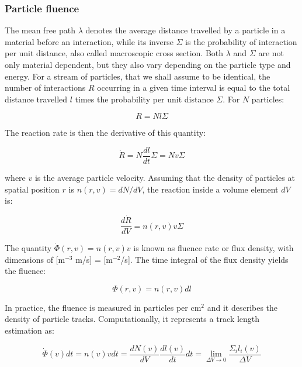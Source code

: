 \documentclass[encoding=utf8,british]{tumphthesis}
\begin{document}
\subsubsection{Particle fluence}

The mean free path $\lambda$ denotes the average distance travelled by a particle in a material before an interaction, while its inverse $\Sigma$ is the probability of interaction per unit distance, also called macroscopic cross section. Both $\lambda$ and $\Sigma$ are not only material dependent, but they also vary depending on the particle type and energy. For a stream of particles, that we shall assume to be identical, the number of interactions $R$ occurring in a given time interval is equal to the total distance travelled $l$ times the probability per unit distance $\Sigma$. For $N$ particles:

\begin{equation}
    R = N l \Sigma
\end{equation}

The reaction rate is then the derivative of this quantity:

\begin{equation}
    \dot{R} = N \frac{dl}{dt}\Sigma = N v \Sigma
\end{equation}

where $v$ is the average particle velocity. Assuming that the density of particles at spatial position $r$ is $n(r,v) = dN/dV$, the reaction inside a volume element $dV$ is:

\begin{equation}
    \frac{d\dot{R}}{dV} = n(r,v) v \Sigma
\end{equation}

The quantity $\dot{\Phi} (r,v) = n(r,v) v$ is known as fluence rate or flux density, with dimensions of [m$^{-3}$ m/s] = [m$^{-2}$/s]. The time integral of the flux density yields the fluence:

\begin{equation}
    \Phi(r,v) = n(r,v) dl
\end{equation}

In practice, the fluence is measured in particles per cm$^2$ and it describes the density of particle tracks. Computationally, it represents a track length estimation as:

\begin{equation}
    \dot{\Phi}(v) dt = n(v) v dt = \frac{dN(v)}{dV}\frac{dl(v)}{dt}dt = \lim_{\Delta V \to 0} \frac{\Sigma_i l_i(v)}{\Delta V}
\end{equation}
\end{document}
